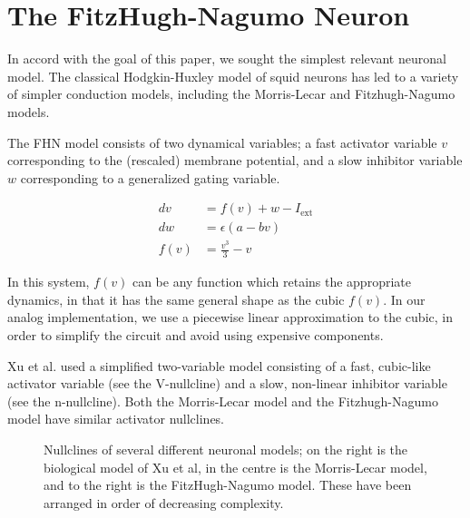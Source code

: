 \documentclass[
    11pt,
]{article}
\begin{document}
\section{The FitzHugh-Nagumo Neuron}\label{sec: fhn}

In accord with the goal of this paper, we sought the simplest relevant neuronal model.  The classical Hodgkin-Huxley\cite{hodgkin1952} model of squid neurons has led to a variety of simpler conduction models, including the Morris-Lecar\cite{morris1981} and Fitzhugh-Nagumo models.

The FHN model consists of two dynamical variables; a fast activator variable $v$ corresponding to the (rescaled) membrane potential, and a slow inhibitor variable $w$ corresponding to a generalized gating variable.

\begin{equation} %
    \label{eq: fhn}
    \begin{aligned}
        dv &= f(v) + w - I_\mathrm{ext}\\
        dw &= ϵ(a - bv)\\
        f(v) &= \frac{v^3}{3} - v
    \end{aligned}
\end{equation}


In this system, $f(v)$ can be any function which retains the appropriate dynamics, in that it has the same general shape as the cubic $f(v)$.  In our analog implementation, we use a piecewise linear approximation to the cubic, in order to simplify the circuit and avoid using expensive components.

Xu et al. used a simplified two-variable model consisting of a fast, cubic-like activator variable (see the V-nullcline) and a slow, non-linear inhibitor variable (see the n-nullcline). Both the Morris-Lecar model and the Fitzhugh-Nagumo model have similar activator nullclines.

\begin{figure}[h!]
    \label{fig: nm nullclines}
    \centering
    \caption{Nullclines of several different neuronal models; on the right is the biological model of Xu et al, in the centre is the Morris-Lecar model, and to the right is the FitzHugh-Nagumo model.  These have been arranged in order of decreasing complexity.}
\end{figure} %
\end{document}
